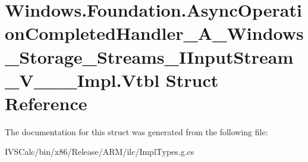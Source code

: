 \hypertarget{struct_windows_1_1_foundation_1_1_async_operation_completed_handler___a___windows___storage___st822a5999fcca92776408c5edabcbbebf}{}\section{Windows.\+Foundation.\+Async\+Operation\+Completed\+Handler\+\_\+\+A\+\_\+\+Windows\+\_\+\+Storage\+\_\+\+Streams\+\_\+\+I\+Input\+Stream\+\_\+\+V\+\_\+\+\_\+\+\_\+\+Impl.\+Vtbl Struct Reference}
\label{struct_windows_1_1_foundation_1_1_async_operation_completed_handler___a___windows___storage___st822a5999fcca92776408c5edabcbbebf}


The documentation for this struct was generated from the following file\+:\begin{DoxyCompactItemize}
\item 
I\+V\+S\+Calc/bin/x86/\+Release/\+A\+R\+M/ilc/Impl\+Types.\+g.\+cs\end{DoxyCompactItemize}
